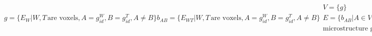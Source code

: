 \begin{subequations}

\begin{equation}
g=\{E_{W} | W, T\, \text{are voxels}, A = g^W_{id}, B = g^T_{id}, A \neq B\}
\label{eq:graindef}
\end{equation}

\begin{equation}
b_{AB}=\{E_{WT} | W, T\, \text{are voxels}, A = g^W_{id}, B = g^T_{id}, A \neq B\}
\label{eq:gbdef}
\end{equation}

\begin{equation}
\begin{aligned}
V=\{g\} \\
E=\{b_{AB} | A \in V, B \in V\} \\
\text{microstructure graph} = (V, E)
\end{aligned}
\label{eq:micrograph}
\end{equation}

\end{subequations}